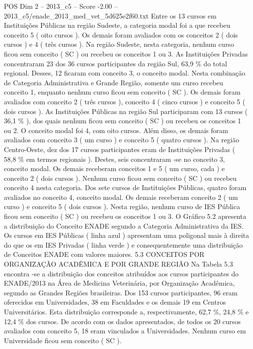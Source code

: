 \begin{textsample}{POS Dim 2 – 2013\_c5 – Score -2.00 – 2013\_c5/enade\_2013\_med\_vet\_5d625e2f60.txt}
Entre os 13 cursos em Instituições Públicas na região Sudeste, a categoria modal foi a que recebeu conceito 5 ( oito cursos ).
Os demais foram avaliados com os conceitos 2 ( dois cursos ) e 4 ( três cursos ).
Na região Sudeste, nesta categoria, nenhum curso ficou sem conceito ( SC ) ou recebeu os conceitos 1 ou 3.
As Instituições Privadas concentraram 23 dos 36 cursos participantes da região Sul, 63,9 \% do total regional.
Desses, 12 ficaram com conceito 3, o conceito modal.
Nesta combinação de Categoria Administrativa e Grande Região, somente um curso recebeu conceito 1, enquanto nenhum curso ficou sem conceito ( SC ).
Os demais foram avaliados com conceito 2 ( três cursos ), conceito 4 ( cinco cursos ) e conceito 5 ( dois cursos ).
As Instituições Públicas na região Sul participaram com 13 cursos ( 36,1 \% ), dos quais nenhum ficou sem conceito ( SC ) ou recebeu os conceitos 1 ou 2.
O conceito modal foi 4, com oito cursos.
Além disso, os demais foram avaliados com conceito 3 ( um curso ) e conceito 5 ( quatro cursos ).
Na região Centro-Oeste, dez dos 17 cursos participantes eram de Instituições Privadas ( 58,8 \% em termos regionais ).
Destes, seis concentraram -se no conceito 3, conceito modal.
Os demais receberam conceitos 1 e 5 ( um curso, cada ) e conceito 2 ( dois cursos ).
Nenhum curso ficou sem conceito ( SC ) ou recebeu conceito 4 nesta categoria.
Dos sete cursos de Instituições Públicas, quatro foram avaliados no conceito 4, conceito modal.
Os demais receberam conceito 2 ( um curso ) e conceito 5 ( dois cursos ).
Nesta região, nenhum curso de IES Pública ficou sem conceito ( SC ) ou recebeu os conceitos 1 ou 3.
O Gráfico 5.2 apresenta a distribuição do Conceito ENADE segundo a Categoria Administrativa da IES.
Os cursos em IES Públicas ( linha azul ) apresentam uma poligonal mais à direita do que os em IES Privadas ( linha verde ) e consequentemente uma distribuição de Conceitos ENADE com valores maiores. 5.3 CONCEITOS POR ORGANIZAÇÃO ACADÊMICA E POR GRANDE REGIÃO Na Tabela 5.3 encontra -se a distribuição dos conceitos atribuídos aos cursos participantes do ENADE/2013 na Área de Medicina Veterinária, por Organização Acadêmica, segundo as Grandes Regiões brasileiras.
Dos 153 cursos participantes, 96 eram oferecidos em Universidades, 38 em Faculdades e os demais 19 em Centros Universitários.
Esta distribuição corresponde a, respectivamente, 62,7 \%, 24,8 \% e 12,4 \% dos cursos.
De acordo com os dados apresentados, de todos os 20 cursos avaliados com conceito 5, 18 eram vinculados a Universidades.
Nenhum curso em Universidade ficou sem conceito ( SC ).

\end{textsample}

